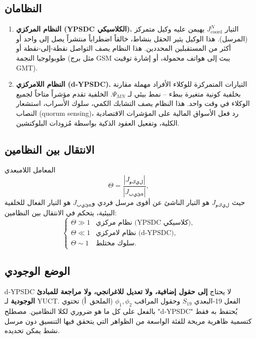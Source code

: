 \documentclass[11pt,a4paper]{article}
\begin{document}
	\subsection{النظامان}
	\begin{enumerate}[leftmargin=*, label=\textbf{(\arabic*)}]
		\item \textbf{النظام المركزي (YPSDC الكلاسيكي).} التيار \(J^{N}_{\mathrm{coord}}\) يهيمن عليه وكيل متمركز (المرسل). هذا الوكيل يثير الحقل بنشاط، خالقاً اضطراباً منتشراً يصل إلى واحد أو أكثر من المستقبلين المحددين. هذا النظام يصف التواصل نقطة‑إلى‑نقطة أو طوبولوجيا النجمة (مثل برج GSM يبث إلى هواتف محمولة، أو إشارة توقيت GMT).
		
		\item \textbf{النظام اللامركزي (d‑YPSDC).} التيارات المتمركزة للوكلاء الأفراد مهملة مقارنة بخلفية كونية متغيرة ببطء – نمط بيئي لـ \(\Psi_{MN}\). الخلفية تقدم مؤشراً متاحاً لجميع الوكلاء في وقت واحد. هذا النظام يصف التشابك الكمي، سلوك الأسراب، استشعار النصاب (quorum sensing)، رد فعل الأسواق المالية على المؤشرات الاقتصادية الكلية، وتفعيل العقود الذكية بواسطة مُزودات البلوكتشين.
	\end{enumerate}
	
	\subsection{الانتقال بين النظامين}
	المعامل اللامبعدي
	\[
	\Theta = \frac{|J_{\mathrm{وكيل}}|}{|J_{\mathrm{بيئة}}|},
	\]
	حيث \(J_{\mathrm{وكيل}}\) هو التيار الناشئ عن أقوى مرسل فردي و\(J_{\mathrm{بيئة}}\) هو التيار الفعال للخلفية البيئية، يتحكم في الانتقال بين النظامين:
	\[
	\begin{cases}
		\Theta \gg 1 & \text{نظام مركزي (YPSDC كلاسيكي)}, \\
		\Theta \ll 1 & \text{نظام لامركزي (d‑YPSDC)}, \\
		\Theta \sim 1 & \text{سلوك مختلط}.
	\end{cases}
	\]
	
	\subsection{الوضع الوجودي}
	d‑YPSDC لا يحتاج \textbf{إلى حقول إضافية، ولا تعديل للاغرانجي، ولا مراجعة للمبادئ الوجودية} لـ YUCT. الفعل 19‑البعدي \(S_{19}\) وحقول المراقب \(\phi_1,\phi_2\) (الملحق~أ) تحتوي بالفعل على كل ما هو ضروري لكلا النظامين. مصطلح "d‑YPSDC" يُحتفظ به فقط كتسمية ظاهرية مريحة للفئة الواسعة من الظواهر التي يتحقق فيها التنسيق دون مرسل نشط يمكن تحديده.
	
\end{document}
